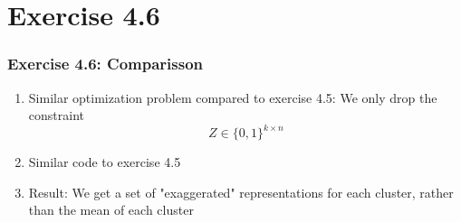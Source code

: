 \documentclass[10pt,aspectratio=169,handout]{beamer}
\begin{document}
\section{Exercise 4.6}

\begin{frame}
    \frametitle{Exercise 4.6: Comparisson}

    \begin{minipage}{0.34\textwidth}
        \begin{enumerate}
            \item Similar optimization problem compared to exercise 4.5: We only drop the constraint \[Z\in \{0,1\}^{k\times n}\]
            \item Similar code to exercise 4.5
            \item Result: We get a set of "exaggerated" representations for each cluster, rather than the mean of each cluster
        \end{enumerate}
    \end{minipage}    
    \begin{minipage}{0.65\textwidth}
        \inputminted[bgcolor=LightGray,fontsize=\small]{python}{code/fw_archetypal_analysis.py}
    \end{minipage}
\end{frame}
\end{document}
